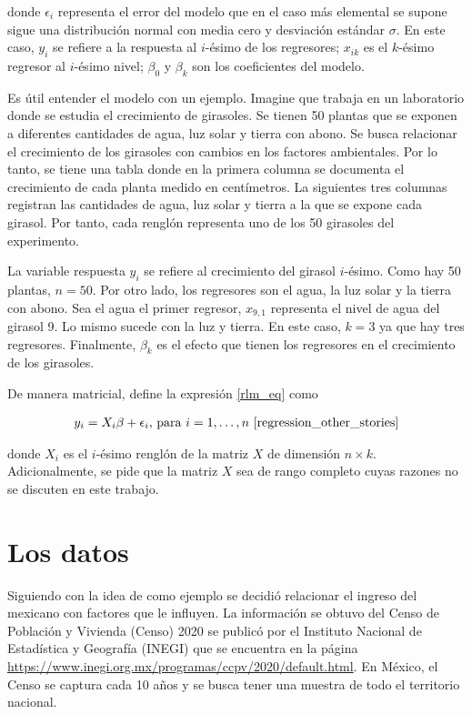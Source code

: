 \noindent donde $\epsilon_i$ representa el error del modelo que en el caso más elemental se supone sigue una distribución normal con media cero y desviación estándar $\sigma$. En este caso, $y_i$ se refiere a la respuesta al $i$-ésimo de los regresores; $x_{ik}$ es el $k$-ésimo regresor al $i$-ésimo nivel; $\beta_0$ y $\beta_k$ son los coeficientes del modelo.

Es útil entender el modelo con un ejemplo. Imagine que trabaja en un laboratorio donde se estudia el crecimiento de girasoles. Se tienen 50 plantas que se exponen a diferentes cantidades de agua, luz solar y tierra con abono. Se busca relacionar el crecimiento de los girasoles con cambios en los factores ambientales. Por lo tanto, se tiene una tabla donde en la primera columna se documenta el crecimiento de cada planta medido en centímetros. La siguientes tres columnas registran las cantidades de agua, luz solar y tierra a la que se expone cada girasol. Por tanto, cada renglón representa uno de los 50 girasoles del experimento. 

La variable respuesta $y_i$ se refiere al crecimiento del girasol $i$-ésimo. Como hay 50 plantas, $n = 50$. Por otro lado, los regresores son el agua, la luz solar y la tierra con abono. Sea el agua el primer regresor, $x_{9,1}$ representa el nivel de agua del girasol 9. Lo mismo sucede con la luz y tierra. En este caso, $k = 3$ ya que hay tres regresores. Finalmente, $\beta_k$ es el efecto que tienen los regresores en el crecimiento de los girasoles. 

De manera matricial, \cite[p.~146]{regression_other_stories} define la expresión \ref{rlm_eq} como 

\begin{equation*}
    \begin{aligned}
    y_i = X_i \beta + \epsilon_i \text{, para } i = 1, \dots, n
    \text{ \cite[p.~146]{regression_other_stories}}
    \end{aligned}
\end{equation*}

\noindent donde $X_i$ es el $i$-ésimo renglón de la matriz $X$ de dimensión $n \times k$. Adicionalmente, se pide que la matriz $X$ sea de rango completo cuyas razones no se discuten en este trabajo. 

\section{Los datos}
Siguiendo con la idea de \cite{seber2003linear} como ejemplo se decidió relacionar el ingreso del mexicano con factores que le influyen. La información se obtuvo del  Censo de Población y Vivienda (Censo) 2020 se publicó por el Instituto Nacional de Estadística y Geografía (INEGI) que se encuentra en la página \url{https://www.inegi.org.mx/programas/ccpv/2020/default.html}. En México, el Censo se captura cada 10 años y se busca tener una muestra de todo el territorio nacional. 

